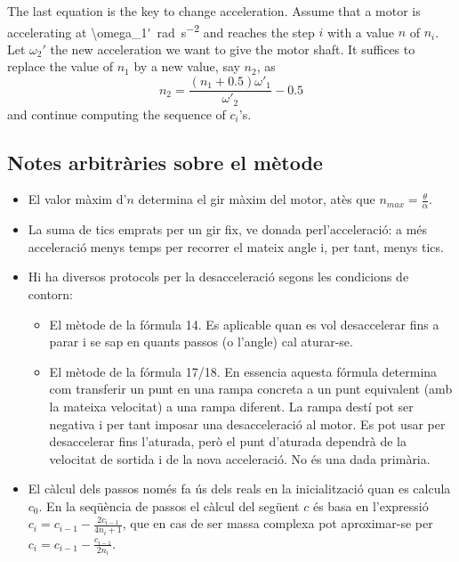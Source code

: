 \documentclass[a4paper]{article}
\newcommand{\vSI}[2]{\SI[math-rm=\ensuremath,parse-numbers=false]{#1}{#2}}
\begin{document}
The last equation is the key to change acceleration. Assume that a
motor is accelerating at \vSI{\omega_1'}{\radian\per\second\squared}
and reaches the step $i$ with a value $n$ of $n_i$. Let $\omega_2'$
the new acceleration we want to give the motor shaft. It suffices to
replace the value of $n_1$ by a new value, say $n_2$, as
\begin{equation*}
  n_2 = \frac{(n_1+0.5)\omega'_1}{\omega'_2} - 0.5 
\end{equation*}
and continue computing the sequence of $c_i$'s.



\subsection{Notes arbitràries sobre el mètode}

\begin{itemize}
\item El valor màxim d'$n$ determina el gir màxim del motor, atès que
  $n_{max} = \frac\theta\alpha$.
\item La suma de tics emprats per un gir fix, ve donada
  perl'acceleració: a més acceleració menys temps per recorrer el
  mateix angle i, per tant, menys tics.
\item Hi ha diversos protocols per la desacceleració segons les
  condicions de contorn:
  \begin{itemize}
  \item El mètode de la fórmula 14. Es aplicable quan es vol
    desaccelerar fins a parar i se sap en quants passos (o l'angle)
    cal aturar-se.
  \item El mètode de la fórmula 17/18. En essencia aquesta fórmula
    determina com transferir un punt en una rampa concreta a un punt
    equivalent (amb la mateixa velocitat) a una rampa diferent. La
    rampa destí pot ser negativa i per tant imposar una desacceleració
    al motor.  Es pot usar per desaccelerar fins l'aturada, però el
    punt d'aturada dependrà de la velocitat de sortida i de la nova
    acceleració. No és una dada primària.
  \end{itemize}
\item El càlcul dels passos només fa ús dels reals en la
  inicialització quan es calcula $c_0$. En la seqüència de passos el
  càlcul del següent $c$ és basa en l'expressió
  $c_i = c_{i-1} - \frac{2c_{i-1}}{4n_i + 1}$, que en cas de ser massa
  complexa pot aproximar-se per
  $c_i = c_{i-1} - \frac{c_{i-1}}{2n_i}$.
\end{itemize}
\end{document}
